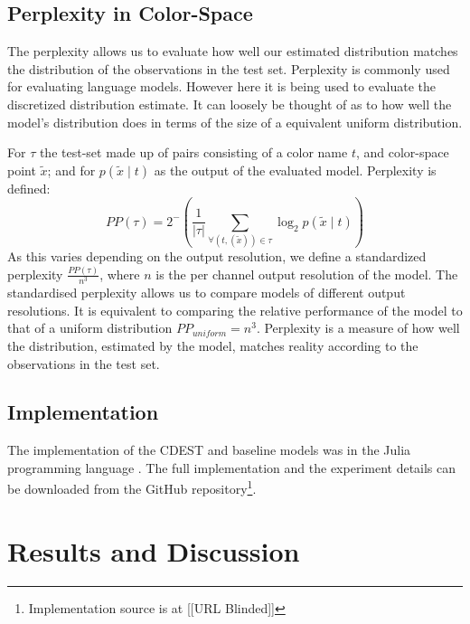\documentclass[11pt,a4paper]{article}
\newcommand{\parencite}{\citep}
\begin{document}
\subsection{Perplexity in Color-Space}
The perplexity allows us to evaluate how well our estimated distribution matches the distribution of the observations in the test set.
Perplexity is commonly used for evaluating language models. However here it is being used to evaluate the discretized distribution estimate.
It can loosely be thought of as to how well the model's distribution does in terms of the size of a equivalent uniform distribution.

For $\tau$ the test-set made up of pairs consisting of a color name $t$, and color-space point $\tilde{x}$;
and for $p(\tilde{x}\mid t)$ as the output of the evaluated model.
Perplexity is defined:
\[
 PP(\tau) = 2^-{\left(
 	\frac{1}{|\tau|} 
 	\sum_{
	 		\forall(t,(\tilde{x})) \in \tau}
 	 \log_2 p(\tilde{x}\mid t)\right)}
\]
As this varies depending on the output resolution,
we define a standardized perplexity $\frac{PP(\tau)}{n^3}$, where $n$ is the per channel output resolution of the model.
The standardised perplexity allows us to compare models of different output resolutions.
It is equivalent to comparing the relative performance of the model to that of a uniform distribution $PP_{uniform}=n^3$.
Perplexity is a measure of how well the distribution, estimated by the model, matches reality according to the observations in the test set.

\subsection{Implementation}
The implementation of the CDEST and baseline models was in the Julia programming language \parencite{Julia}.
The full implementation and the experiment details can be downloaded from the GitHub repository\footnote{Implementation source is at %
[[URL Blinded]]}.


\section{Results and Discussion}\label{sec:results-and-discussion}
\end{document}
